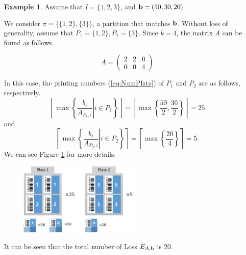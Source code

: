 \documentclass[a4paper]{amsart}
\numberwithin{equation}{section} %
\numberwithin{figure}{section} %
\numberwithin{table}{section}
\theoremstyle{plain}
\theoremstyle{definition}
\newtheorem{example}[thm]{Example}
\theoremstyle{plain}
\theoremstyle{plain}
\theoremstyle{plain}
\theoremstyle{plain}
\theoremstyle{plain}
\begin{document}
\begin{example}
	Assume that $I=\{1,2,3\}$, and ${\bf b}=(50,30,20)$.
	
	We consider $\pi = \{\{1,2\}, \{3\}\}$, a partition that matches ${\bf b}$. 
	Without loss of generality, assume that $P_{1} = \{1,2\}, P_{2} = \{3\}$. Since $k = 4$, the matrix $A$ can be found as follows.
	
	\begin{equation}
		A = \left(\begin{array}{ccc}2 & 2 & 0 \\ 0 & 0 & 4 \end{array}\right)
	\end{equation}
	
	In this case, the printing numbers (\ref{eq:NumPlate}) of $P_1$ and $P_2$ are as follows, respectively.
	\begin{equation}
		\left\lceil \max\left\{ \left. \frac{b_{i}}{A_{P_{1},i}} \right| i \in P_{1} \right\} \right\rceil = \left\lceil \max \left\{ \frac{50}{2}, \frac{30}{2} \right\} \right\rceil = 25
	\end{equation}
	and
	\begin{equation}
	\left\lceil \max\left\{ \left. \frac{b_{i}}{A_{P_{2},i}} \right| i \in P_{2} \right\} \right\rceil = \left\lceil \max \left\{ \frac{20}{4} \right\} \right\rceil = 5.
	\end{equation}
	We can see Figure \ref{fig:ex11} for more details.
	
	\begin{figure}[h!]
		\centering
		\includegraphics[width=6cm]{ex11.pdf}
		\caption{}
		\label{fig:ex11}       %
	\end{figure}
	
	It can be seen that the total number of Loss $E_{A,{\bf b}}$ is 20.
	

\end{example}
\end{document}
